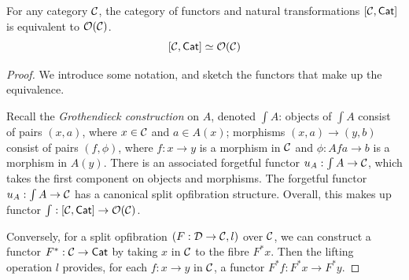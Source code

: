 \begin{theorem}\label{thm:opfibration-main}
  For any category $\mathcal{C}$,
  the category of functors and natural transformations
  $[\mathcal{C},\mathsf{Cat}]$ is equivalent to ${\mathcal{O}}(\mathcal{C})$.
  \[[\mathcal{C},\mathsf{Cat}] \simeq {\mathcal{O}}(\mathcal{C})\] 
\end{theorem}
\begin{proof}
  We introduce some notation,
  and sketch the functors that make up the equivalence.
   
  Recall the \emph{Grothendieck construction} on $A$,
  denoted $\int A$:
  objects of $\int A$ consist of pairs $(x, a)$,
  where $x \in \mathcal{C}$ and $a \in A(x)$;
  morphisms $(x,a) \to (y,b)$ consist of pairs $(f,\phi)$,
  where $f : x \to y$ is a morphism in $\mathcal{C}$
  and $\phi : A f a \to b$ is a morphism in $A(y)$.
  There is an associated forgetful functor $u_A : \int A \to \mathcal{C}$,
  which takes the first component on objects and morphisms.
  The forgetful functor $u_A : \int A \to \mathcal{C}$
  has a canonical split opfibration structure.
  Overall, this makes up functor $\int : [\mathcal{C},\mathsf{Cat}] \to {\mathcal{O}}(\mathcal{C})$.

  Conversely, for a split opfibration $(F : \mathcal{D} \to \mathcal{C}, l)$ over $\mathcal{C}$,
  we can construct a functor $F^* : \mathcal{C} \to \mathsf{Cat}$ by taking
  $x$ in $\mathcal{C}$ to the fibre $F^* x$.
  Then the lifting operation $l$ provides, for each $f : x \to y$ in $\mathcal{C}$,
  a functor $F^* f : F^* x \to F^* y$.
\end{proof}

